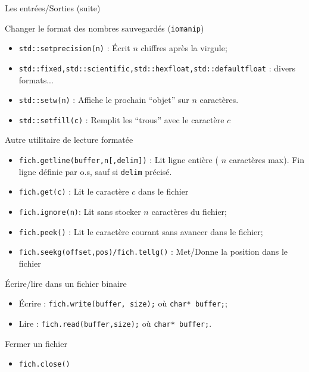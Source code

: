 \documentclass[handout,10pt]{beamer}
\begin{document}
\begin{frame}[fragile]{Les entrées/Sorties (suite)}
\tiny
 \begin{block}{Changer le format des nombres sauvegardés (\texttt{iomanip})}
 \begin{itemize}
 \item \lstinline$std::setprecision(n)$ : \'Ecrit $n$ chiffres après la virgule;
 \item \lstinline$std::fixed,std::scientific,std::hexfloat,std::defaultfloat$ : divers formats...
 \item \lstinline$std::setw(n)$ : Affiche le prochain ``objet'' sur $n$ caractères.
 \item \lstinline$std::setfill(c)$ : Remplit les ``trous'' avec le caractère $c$
 \end{itemize}
 \end{block}

 \begin{block}{Autre utilitaire de lecture formatée}
  \begin{itemize}
   \item \lstinline$fich.getline(buffer,n[,delim])$ : Lit ligne entière ( $n$ caractères max). Fin ligne définie par o.s,
   sauf si \lstinline$delim$ précisé.
   \item \lstinline$fich.get(c)$ : Lit le caractère $c$ dans le fichier
   \item \lstinline$fich.ignore(n)$: Lit sans stocker $n$ caractères du fichier;
   \item \lstinline$fich.peek()$ : Lit le caractère courant sans avancer dans le fichier;
   \item \lstinline$fich.seekg(offset,pos)/fich.tellg()$ : Met/Donne la position dans le fichier
  \end{itemize}
 \end{block}

 
 \begin{block}{\'Ecrire/lire dans un fichier binaire}
  \begin{itemize}
   \item \'Ecrire : \lstinline$fich.write(buffer, size);$ où \lstinline$char* buffer;$;
   \item Lire     : \lstinline$fich.read(buffer,size);$ où \lstinline$char* buffer;$.
  \end{itemize}
 \end{block}
 
 \begin{block}{Fermer un fichier}
    \begin{itemize}
     \item \lstinline$fich.close()$
    \end{itemize}
 \end{block} 
\end{frame}
\end{document}
